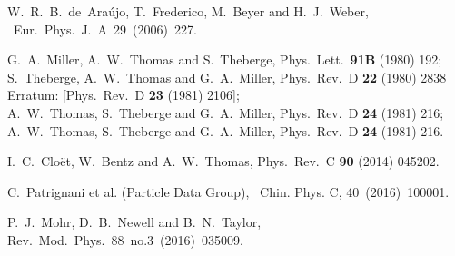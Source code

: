 \documentclass[preprint,aps,showpacs,floatfix]{revtex4}
\begin{document}
\begin{thebibliography}{99}
W.~R.~B.~de~Ara\'ujo, T.~Frederico, M.~Beyer and H.~J.~Weber,
~Eur.~Phys.~J.~A~29~(2006)~227.


  G.~A.~Miller, A.~W.~Thomas and S.~Theberge,
  Phys.\ Lett.\  {\bf 91B} (1980) 192;\\
  S.~Theberge, A.~W.~Thomas and G.~A.~Miller,
  Phys.\ Rev.\ D {\bf 22} (1980) 2838
   Erratum: [Phys.\ Rev.\ D {\bf 23} (1981) 2106];\\
  A.~W.~Thomas, S.~Theberge and G.~A.~Miller,
  Phys.\ Rev.\ D {\bf 24} (1981) 216;\\

  A.~W.~Thomas, S.~Theberge and G.~A.~Miller,
  Phys.\ Rev.\ D {\bf 24} (1981) 216.
  
  
  I.~C.~Clo\"{e}t, W.~Bentz and A.~W.~Thomas,
  Phys.\ Rev.\ C {\bf 90} (2014) 045202.
  
  
C.~Patrignani et al. (Particle Data Group),
~Chin. Phys. C, 40~(2016)~100001.


 P.~J.~Mohr, D.~B.~Newell and B.~N.~Taylor,
  Rev.~Mod.~Phys.~88~no.3~(2016)~035009. %
 

\end{thebibliography}
\end{document}
